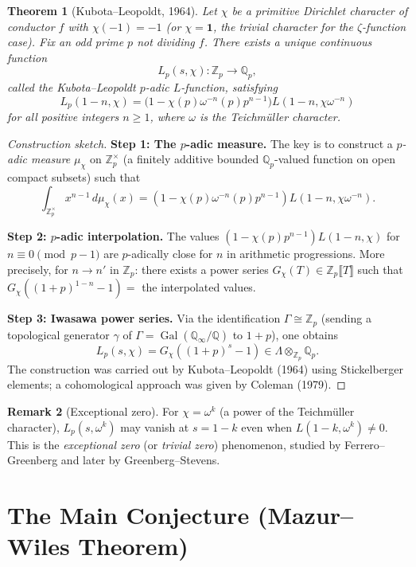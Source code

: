 \documentclass[12pt,a4paper]{amsart}
\newtheorem{theorem}{Theorem}[section]
\theoremstyle{definition}
\newtheorem{remark}[theorem]{Remark}
\newcommand{\Q}{\mathbb{Q}}
\newcommand{\Zp}{\mathbb{Z}_p}
\newcommand{\Qp}{\mathbb{Q}_p}
\DeclareMathOperator{\Gal}{Gal}
\begin{document}
\begin{theorem}[Kubota--Leopoldt, 1964]
\label{thm:kubota_leopoldt}
Let $\chi$ be a primitive Dirichlet character of conductor $f$ with
$\chi(-1) = -1$ (or $\chi = \mathbf{1}$, the trivial character for the
$\zeta$-function case).  Fix an odd prime $p$ not dividing $f$.
There exists a unique continuous function
\[
  L_p(s, \chi) : \Zp \longrightarrow \Qp,
\]
called the \emph{Kubota--Leopoldt $p$-adic $L$-function}, satisfying
\[
  L_p(1-n, \chi) = \bigl(1 - \chi(p)\omega^{-n}(p) p^{n-1}\bigr)
                   L(1-n, \chi\omega^{-n})
\]
for all positive integers $n \geq 1$, where $\omega$ is
the Teichmüller character.
\end{theorem}

\begin{proof}[Construction sketch]
\textbf{Step 1: The $p$-adic measure.}
The key is to construct a \emph{$p$-adic measure} $\mu_\chi$ on $\Zp^\times$
(a finitely additive bounded $\Qp$-valued function on open compact subsets)
such that
\[
  \int_{\Zp^\times} x^{n-1} \, d\mu_\chi(x)
  = (1 - \chi(p)\omega^{-n}(p)p^{n-1}) L(1-n, \chi\omega^{-n}).
\]

\textbf{Step 2: $p$-adic interpolation.}
The values $(1 - \chi(p)p^{n-1}) L(1-n, \chi)$ for $n \equiv 0 \pmod{p-1}$
are $p$-adically close for $n$ in arithmetic progressions.  More precisely,
for $n \to n'$ in $\Zp$: there exists a power series
$G_\chi(T) \in \Zp\llbracket T \rrbracket$ such that
$G_\chi((1+p)^{1-n} - 1) = $ the interpolated values.

\textbf{Step 3: Iwasawa power series.}
Via the identification $\Gamma \cong \Zp$ (sending a topological generator
$\gamma$ of $\Gamma = \Gal(\Q_\infty/\Q)$ to $1+p$), one obtains
\[
  L_p(s, \chi) = G_\chi((1+p)^s - 1) \in \Lambda \otimes_{\Zp} \Qp.
\]
The construction was carried out by Kubota--Leopoldt (1964) using
Stickelberger elements; a cohomological approach was given by Coleman (1979).
\end{proof}

\begin{remark}[Exceptional zero]
For $\chi = \omega^k$ (a power of the Teichmüller character), $L_p(s, \omega^k)$
may vanish at $s = 1-k$ even when $L(1-k, \omega^k) \ne 0$.  This is the
\emph{exceptional zero} (or \emph{trivial zero}) phenomenon, studied by
Ferrero--Greenberg and later by Greenberg--Stevens.
\end{remark}

\section{The Main Conjecture (Mazur--Wiles Theorem)}
\end{document}
